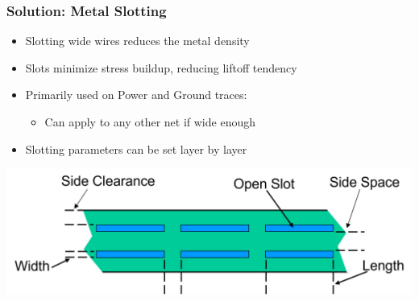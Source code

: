 \documentclass[compress]{beamer}
\begin{document}
\begin{frame}
	\frametitle{Solution: Metal Slotting}
	\begin{itemize}
		\item Slotting wide wires reduces the metal density
		\item Slots minimize stress buildup, reducing liftoff
		tendency
		\item Primarily used on Power and Ground traces:
		\begin{itemize}
			\item Can apply to any other net if wide enough
		\end{itemize}
		
		\item Slotting parameters can be set layer by layer
	\end{itemize}
	\begin{center}
		\includegraphics[width=\textwidth]{Slotting}
	\end{center}
\end{frame}
\end{document}
